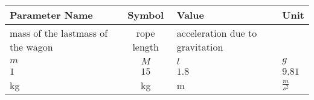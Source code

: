 \begin{tabular}{lcll}
\hline
 Parameter Name                    &   Symbol    & Value                           & Unit            \\
\hline
 mass of the lastmass of the wagon & rope length & acceleration due to gravitation &                 \\
 $m$                               &     $M$     & $l$                             & $g$             \\
 $1$                               &    $15$     & $1.8$                           & $9.81$          \\
 kg                                &     kg      & m                               & $\frac{m}{s^2}$ \\
\hline
\end{tabular}